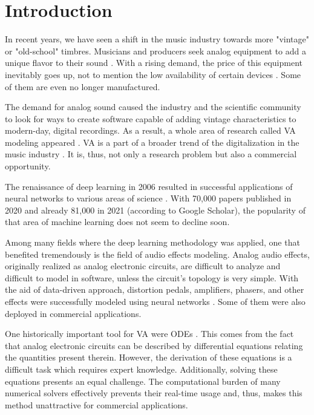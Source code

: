 \chapter{Introduction}
\label{chap:Introduction}

In recent years, we have seen a shift in the music industry towards more "vintage" or "old-school" timbres. Musicians and producers seek analog equipment to add a unique flavor to their sound \cite{Parker2013,Stilson2006,DAngelo2014}. With a rising demand, the price of this equipment inevitably goes up, not to mention the low availability of certain devices \cite{Kiiski2016}. Some of them are even no longer manufactured.

The demand for analog sound caused the industry and the scientific community to look for ways to create software capable of adding vintage characteristics to modern-day, digital recordings. As a result, a whole area of research called \ac{VA} modeling appeared \cite{Parker2013,Stilson2006,DAngelo2014,Werner2016}. \ac{VA} is a part of a broader trend of the digitalization in the music industry \cite{Zoelzer2011,Valimaki2010}. It is, thus, not only a research problem but also a commercial opportunity.

The renaissance of deep learning in 2006 resulted in successful applications of neural networks to various areas of science \cite{Goodfellow-et-al-2016}. With 70,000 papers published in 2020 and already 81,000 in 2021 (according to Google Scholar), the popularity of that area of machine learning does not seem to decline soon.

Among many fields where the deep learning methodology was applied, one that benefited tremendously is the field of audio effects modeling. Analog audio effects, originally realized as analog electronic circuits, are difficult to analyze and difficult to model in software, unless the circuit's topology is very simple. With the aid of data-driven approach, distortion pedals, amplifiers, phasers, and other effects were successfully modeled using neural networks \cite{Parker2019,Wright2019,Wright2019a,Wright2020}. Some of them were also deployed in commercial applications.

One historically important tool for \ac{VA} were \acfp{ODE} \cite{Yeh2007,Yeh2008}. This comes from the fact that analog electronic circuits can be described by differential equations relating the quantities present therein. However, the derivation of these equations is a difficult task which requires expert knowledge. Additionally, solving these equations presents an equal challenge. The computational burden of many numerical solvers effectively prevents their real-time usage and, thus, makes this method unattractive for commercial applications.

